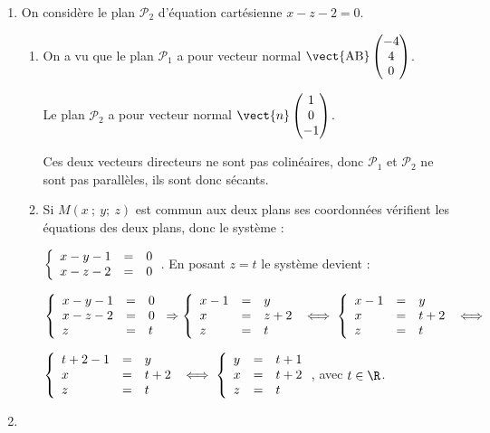 \begin{enumerate}
\begin{enumerate}
	\end{enumerate}	
\item On considère le plan $\mathcal{P}_2$ d'équation cartésienne $x - z - 2 = 0$.
	\begin{enumerate}
		\item 
On a vu que le plan $\mathcal{P}_1$ a pour vecteur normal $\vect{\text{AB}}\begin{pmatrix}-4\\4\\0\end{pmatrix}$.

Le plan $\mathcal{P}_2$ a pour vecteur normal $\vect{n}\begin{pmatrix}1\\0\\-1\end{pmatrix}$.

Ces deux vecteurs directeurs ne sont pas colinéaires, donc $\mathcal{P}_1$ et $\mathcal{P}_2$ ne sont pas parallèles, ils sont donc sécants.
		\item 
		






Si $M(x~;~y;~z)$ est commun aux deux plans ses coordonnées vérifient les équations des deux plans, donc le système :

$\left\{\begin{array}{l c l}
x - y - 1 &=& 0\\
x - z - 2 &=& 0
\end{array}\right.$. En posant $z = t$ le système devient :

$\left\{\begin{array}{l c l}
x - y - 1 &=& 0\\
x - z - 2 &=& 0\\
z&=&t
\end{array}\right.\Rightarrow \left\{\begin{array}{l c l}
x - 1 &=&y\\
x &=&z + 2\\
z&=&t
\end{array}\right. \iff \left\{\begin{array}{l c l}
x - 1 &=&y\\
x &=&t + 2\\
z&=&t
\end{array}\right. \iff$

$\left\{\begin{array}{l c l}
t + 2 - 1 &=&y\\
x &=&t + 2\\
z&=&t
\end{array}\right. 
\iff \left\{\begin{array}{l c l}
y&=&t + 1\\
x &=&t + 2\\
z&=&t
\end{array}\right.$, avec $t \in \R$.
	\end{enumerate}
\item  



\end{enumerate}
